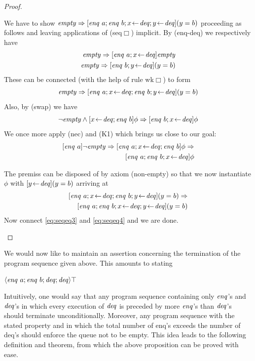 \begin{proof}
\begin{itemize}
We have to show $\mathit{empty} \Rightarrow [\mathit{enq}~a; \mathit{enq}~b; x \!\gets\! \mathit{deq}; y \!\gets\!
\mathit{deq}](y=b)$ proceeding as follows and leaving applications of (seq$\Box$)
implicit. By (enq-deq) we respectively have
\[\begin{split}
\mathit{empty} \Rightarrow [\mathit{enq}~a; x\!\gets\! \mathit{deq}]\mathit{empty}\\
\mathit{empty} \Rightarrow [\mathit{enq}~b; y\!\gets\! \mathit{deq}](y=b)
\end{split}\]
These can be connected (with the help of rule wk$\Box$) to form
\begin{equation}
\label{eq:seqeq3}
\mathit{empty} \Rightarrow [\mathit{enq}~a; x\!\gets\! \mathit{deq}; \mathit{enq}~b; y\!\gets\! \mathit{deq}](y=b)
\end{equation}
Also, by (swap) we have
\[
\lnot \mathit{empty} \land [x\!\gets\! \mathit{deq}; \mathit{enq}~b]\phi \Rightarrow [\mathit{enq}~b; x\!\gets\! \mathit{deq}]\phi
\]
We once more apply (nec) and (K1) which brings us close to our goal:
\[ \begin{split}
[\enq~a]\lnot \qmt \Rightarrow [\enq~a;x\leteq \deq; \enq~b]\phi \Rightarrow \\
    [\enq~a; \enq~b; x\leteq \deq]\phi
\end{split} \]

The premiss can be disposed of by axiom (non-empty) so that we now
instantiate $\phi$ with $[y\!\gets\! \mathit{deq}](y=b)$ arriving at
\begin{equation}
\label{eq:seqeq4}
\begin{split}
[\enq~a;x\leteq \deq; \enq~b; y\leteq \deq](y=b) \Rightarrow \\
    [\enq~a; \enq~b; x\leteq \deq; y\leteq \deq](y=b)
\end{split}
\end{equation}
Now connect  \eqref{eq:seqeq3} and \eqref{eq:seqeq4} and we are done.

\end{itemize}
\end{proof}

We would now like to maintain an assertion concerning the termination of the
program sequence given above. This amounts to stating

\begin{prop}
$\langle \mathit{enq}~a; \mathit{enq}~b; \mathit{deq}; \mathit{deq}\rangle \top$
\end{prop}

Intuitively, one would say that any program sequence containing only $\mathit{enq}$'s
and $\mathit{deq}$'s in which every execution of $\mathit{deq}$ is preceded by more $\mathit{enq}$'s
than $\mathit{deq}$'s should terminate unconditionally. Moreover, any program sequence
with the stated property and in which the total number of enq's exceeds the
number of deq's should enforce the queue not to be empty. This idea leads to the
following definition and theorem, from which the above proposition can be proved
with ease.


